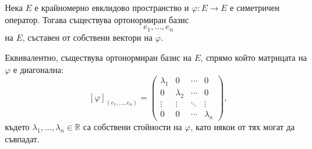 \begin{keythm}
Нека $E$ е крайномерно евклидово пространство и $\varphi:E\to E$ е симетричен оператор. Тогава съществува ортонормиран базис
\[
e_1,\ldots,e_n
\]
на $E$, съставен от собствени вектори на $\varphi$.

Еквивалентно, съществува ортонормиран базис на $E$, спрямо който матрицата на $\varphi$ е диагонална:
\[
[\varphi]_{(e_1,\ldots,e_n)}
=
\begin{pmatrix}
\lambda_1 & 0 & \cdots & 0\\
0 & \lambda_2 & \cdots & 0\\
\vdots & \vdots & \ddots & \vdots\\
0 & 0 & \cdots & \lambda_n
\end{pmatrix},
\]
където $\lambda_1,\ldots,\lambda_n\in\mathbb{R}$ са собствени стойности на $\varphi$, като някои от тях могат да съвпадат.
\end{keythm}

